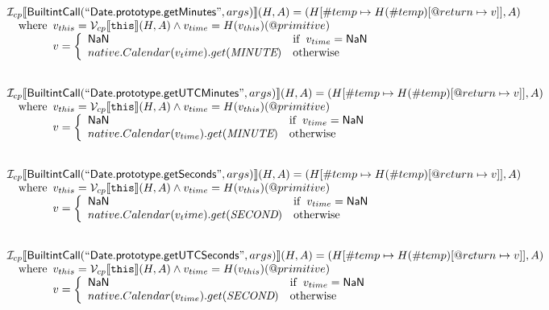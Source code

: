\[
\begin{array}{l}

\mathcal{I} _{cp}\llbracket \mbox{\textsf{BuiltintCall}}(``\mbox{\textsf{Date.prototype.getMinutes}}",args)\rrbracket(H,A)
  = (H[\#temp \mapsto H(\#temp)[@return \mapsto v]], A)\\
\quad{\rm where}\begin{array}[t]{l}
  v_{this} = \mathcal{V} _{cp}\llbracket \mbox{\texttt{this}}\rrbracket (H,A) \land v_{time} = H(v_{this})(@primitive)\\
  v = \left\{\begin{array}{ll}
    \mbox{\textsf{NaN}}  & {\rm if}\begin{array}[t]{l}v_{time} = \mbox{\textsf{NaN}}\end{array}\\
    native.Calendar(v_time).get(\emph{MINUTE}) & {\rm otherwise}
    \end{array}\right.
  \end{array}\\
\\\\

\mathcal{I} _{cp}\llbracket \mbox{\textsf{BuiltintCall}}(``\mbox{\textsf{Date.prototype.getUTCMinutes}}",args)\rrbracket(H,A)
  = (H[\#temp \mapsto H(\#temp)[@return \mapsto v]], A)\\
\quad{\rm where}\begin{array}[t]{l}
  v_{this} = \mathcal{V} _{cp}\llbracket \mbox{\texttt{this}}\rrbracket (H,A) \land v_{time} = H(v_{this})(@primitive)\\
  v = \left\{\begin{array}{ll}
    \mbox{\textsf{NaN}}  & {\rm if}\begin{array}[t]{l}v_{time} = \mbox{\textsf{NaN}}\end{array}\\
    native.Calendar(v_{time}).get(\emph{MINUTE}) & {\rm otherwise}
    \end{array}\right.
  \end{array}\\
\\\\

\mathcal{I} _{cp}\llbracket \mbox{\textsf{BuiltintCall}}(``\mbox{\textsf{Date.prototype.getSeconds}}",args)\rrbracket(H,A)
  = (H[\#temp \mapsto H(\#temp)[@return \mapsto v]], A)\\
\quad{\rm where}\begin{array}[t]{l}
  v_{this} = \mathcal{V} _{cp}\llbracket \mbox{\texttt{this}}\rrbracket (H,A) \land v_{time} = H(v_{this})(@primitive)\\
  v = \left\{\begin{array}{ll}
    \mbox{\textsf{NaN}}  & {\rm if}\begin{array}[t]{l}v_{time} = \mbox{\textsf{NaN}}\end{array}\\
    native.Calendar(v_time).get(\emph{SECOND}) & {\rm otherwise}
    \end{array}\right.
  \end{array}\\
\\\\

\mathcal{I} _{cp}\llbracket \mbox{\textsf{BuiltintCall}}(``\mbox{\textsf{Date.prototype.getUTCSeconds}}",args)\rrbracket(H,A)
  = (H[\#temp \mapsto H(\#temp)[@return \mapsto v]], A)\\
\quad{\rm where}\begin{array}[t]{l}
  v_{this} = \mathcal{V} _{cp}\llbracket \mbox{\texttt{this}}\rrbracket (H,A) \land v_{time} = H(v_{this})(@primitive)\\
  v = \left\{\begin{array}{ll}
    \mbox{\textsf{NaN}}  & {\rm if}\begin{array}[t]{l}v_{time} = \mbox{\textsf{NaN}}\end{array}\\
    native.Calendar(v_{time}).get(\emph{SECOND}) & {\rm otherwise}
    \end{array}\right.
  \end{array}\\
\\\\


\end{array}\]
